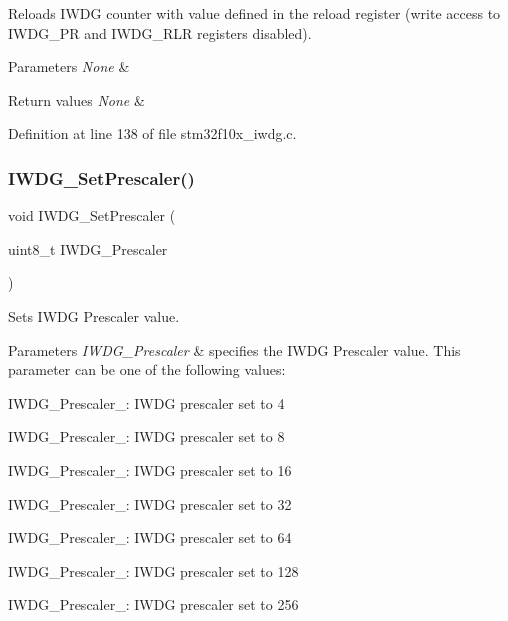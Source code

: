 Reloads I\+W\+DG counter with value defined in the reload register (write access to I\+W\+D\+G\+\_\+\+PR and I\+W\+D\+G\+\_\+\+R\+LR registers disabled). 


\begin{DoxyParams}{Parameters}
{\em None} & \\
\hline
\end{DoxyParams}

\begin{DoxyRetVals}{Return values}
{\em None} & \\
\hline
\end{DoxyRetVals}


Definition at line 138 of file stm32f10x\+\_\+iwdg.\+c.

\mbox{\label{group___i_w_d_g___exported___functions_ga4fa7f1cd690533a35ad9e4729c0450a3}} 
\subsubsection{\texorpdfstring{I\+W\+D\+G\+\_\+\+Set\+Prescaler()}{IWDG\_SetPrescaler()}}
{\footnotesize\ttfamily void I\+W\+D\+G\+\_\+\+Set\+Prescaler (\begin{DoxyParamCaption}\item[{uint8\+\_\+t}]{I\+W\+D\+G\+\_\+\+Prescaler }\end{DoxyParamCaption})}



Sets I\+W\+DG Prescaler value. 


\begin{DoxyParams}{Parameters}
{\em I\+W\+D\+G\+\_\+\+Prescaler} & specifies the I\+W\+DG Prescaler value. This parameter can be one of the following values\+: \begin{DoxyItemize}
\item I\+W\+D\+G\+\_\+\+Prescaler\+\_\+: I\+W\+DG prescaler set to 4 \item I\+W\+D\+G\+\_\+\+Prescaler\+\_\+: I\+W\+DG prescaler set to 8 \item I\+W\+D\+G\+\_\+\+Prescaler\+\_\+: I\+W\+DG prescaler set to 16 \item I\+W\+D\+G\+\_\+\+Prescaler\+\_\+: I\+W\+DG prescaler set to 32 \item I\+W\+D\+G\+\_\+\+Prescaler\+\_\+: I\+W\+DG prescaler set to 64 \item I\+W\+D\+G\+\_\+\+Prescaler\+\_\+: I\+W\+DG prescaler set to 128 \item I\+W\+D\+G\+\_\+\+Prescaler\+\_\+: I\+W\+DG prescaler set to 256 \end{DoxyItemize}
\\
\hline
\end{DoxyParams}

